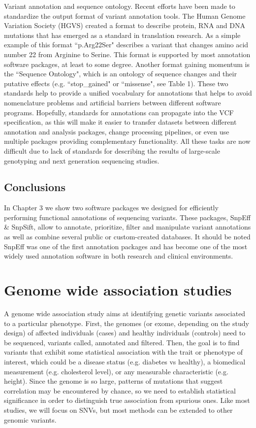 \begin{framed}
{Variant annotation and sequence ontology. Recent efforts have been made to standardize the output format of variant annotation tools. The Human Genome Variation Society (HGVS) created a format to describe protein, RNA and DNA mutations that has emerged as a standard in translation research. As a simple example of this format ``p.Arg22Ser" describes a variant that changes amino acid number 22 from Arginine to Serine. This format is supported by most annotation software packages, at least to some degree. Another format gaining momentum is the ``Sequence Ontology", which is an ontology of sequence changes and their putative effects (e.g. ``stop\_gained" or ``missense", see Table 1). These two standards help to provide a unified vocabulary for annotations that helps to avoid nomenclature problems and artificial barriers between different software programs. Hopefully, standards for annotations can propagate into the VCF specification, as this will make it easier to transfer datasets between different annotation and analysis packages, change processing pipelines, or even use multiple packages providing complementary functionality. All these tasks are now difficult due to lack of standards for describing the results of large-scale genotyping and next generation sequencing studies. 
}
\end{framed}

\subsection{Conclusions}

In Chapter 3 we show two software packages we designed for efficiently performing functional annotations of sequencing variants. These packages, SnpEff \& SnpSift, allow to annotate, prioritize, filter and manipulate variant annotations as well as combine several public or custom-created databases. It should be noted SnpEff was one of the first annotation packages and has become one of the most widely used annotation software in both research and clinical environments. 

\section{Genome wide association studies}

A genome wide association study aims at identifying genetic variants associated to a particular phenotype. First, the genomes (or exome, depending on the study design) of affected individuals (cases) and healthy individuals (controls) need to be sequenced, variants called, annotated and filtered. Then, the goal is to find variants that exhibit some statistical association with the trait or phenotype of interest, which could be a disease status (e.g. diabetes vs healthy), a biomedical measurement (e.g. cholesterol level), or any measurable characteristic (e.g. height). Since the genome is so large, patterns of mutations that suggest correlation may be encountered by chance, so we need to establish statistical significance in order to distinguish true association from spurious ones. Like most studies, we will focus on SNVs, but most methods can be extended to other genomic variants.

